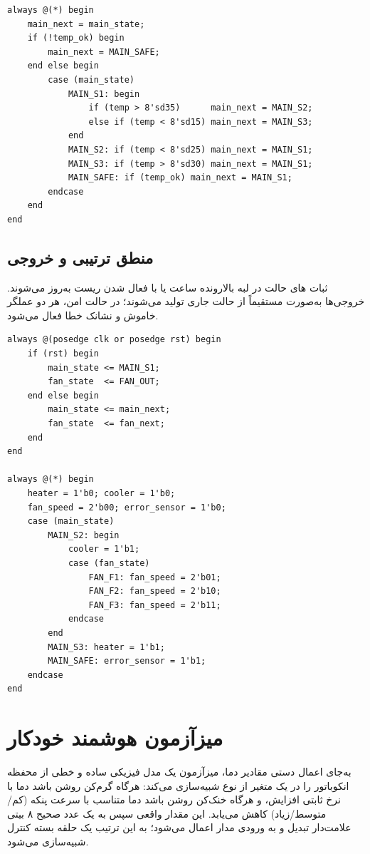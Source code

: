 \documentclass[11pt,a4paper]{article}
\begin{document}
\begin{latin}
\begin{lstlisting}
always @(*) begin
    main_next = main_state;
    if (!temp_ok) begin
        main_next = MAIN_SAFE;
    end else begin
        case (main_state)
            MAIN_S1: begin
                if (temp > 8'sd35)      main_next = MAIN_S2;
                else if (temp < 8'sd15) main_next = MAIN_S3;
            end
            MAIN_S2: if (temp < 8'sd25) main_next = MAIN_S1;
            MAIN_S3: if (temp > 8'sd30) main_next = MAIN_S1;
            MAIN_SAFE: if (temp_ok) main_next = MAIN_S1;
        endcase
    end
end
\end{lstlisting}
\end{latin}

\subsection{منطق ترتیبی و خروجی}
ثبات های حالت در لبه بالارونده ساعت یا با فعال شدن ریست به‌روز می‌شوند. خروجی‌ها به‌صورت  مستقیماً از حالت جاری تولید می‌شوند؛ در حالت امن، هر دو عملگر خاموش و نشانک خطا فعال می‌شود.

\begin{latin}
\begin{lstlisting}
always @(posedge clk or posedge rst) begin
    if (rst) begin
        main_state <= MAIN_S1;
        fan_state  <= FAN_OUT;
    end else begin
        main_state <= main_next;
        fan_state  <= fan_next;
    end
end

always @(*) begin
    heater = 1'b0; cooler = 1'b0;
    fan_speed = 2'b00; error_sensor = 1'b0;
    case (main_state)
        MAIN_S2: begin
            cooler = 1'b1;
            case (fan_state)
                FAN_F1: fan_speed = 2'b01;
                FAN_F2: fan_speed = 2'b10;
                FAN_F3: fan_speed = 2'b11;
            endcase
        end
        MAIN_S3: heater = 1'b1;
        MAIN_SAFE: error_sensor = 1'b1;
    endcase
end
\end{lstlisting}
\end{latin}

\section{میزآزمون هوشمند خودکار}
به‌جای اعمال دستی مقادیر دما، میزآزمون یک مدل فیزیکی ساده و خطی از محفظه انکوباتور را در یک متغیر از نوع  شبیه‌سازی می‌کند: هرگاه گرم‌کن روشن باشد دما با نرخ ثابتی افزایش، و هرگاه خنک‌کن روشن باشد دما متناسب با سرعت پنکه (کم/متوسط/زیاد) کاهش می‌یابد. این مقدار واقعی سپس به یک عدد صحیح ۸ بیتی علامت‌دار تبدیل و به ورودی مدار اعمال می‌شود؛ به این ترتیب یک حلقه بسته کنترل شبیه‌سازی می‌شود.
\end{document}
